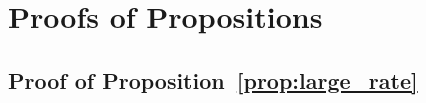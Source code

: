 %
%
%


\section{Proofs of Propositions}

\subsection{Proof of Proposition~\ref{prop:large_rate}}
\label{appendix:proof_large_rate}

